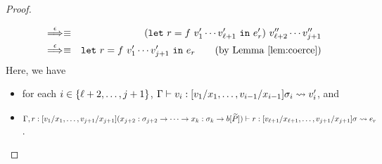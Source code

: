 \begin{proof}
\begin{itemize}
\begin{eqnarray*}
&\stackrel{\epsilon}{\Longrightarrow}_{}\equiv&(\mathtt{let~}r=f\ v_1'\cdots v_{\ell+1}'\mathtt{~in~}e_r')\ v_{\ell+2}''\cdots v_{j+1}'' \\
&\stackrel{\epsilon}{\Longrightarrow}_{}\equiv& \mathtt{let~}r=f\ v_1'\cdots v_{j+1}'\mathtt{~in~}e_r \qquad (\mbox{by Lemma~\ref{lem:coerce}})
\end{eqnarray*}
Here, we have
\begin{itemize}
\item for each \(i \in \{\ell+2,\dots,j+1\}\),
\(\Gamma \vdash v_i : [v_1/x_1,\dots,v_{i-1}/x_{i-1}]\sigma_i \leadsto v_i'\), and
\item
\(\Gamma,r:[v_1/x_1,\dots,v_{j+1}/x_{j+1}](x_{j+2}:\sigma_{j+2} \to \cdots \to x_k:\sigma_k \to b[\widetilde{P}]) \vdash r : [v_{\ell+1}/x_{\ell+1},\dots,v_{j+1}/x_{j+1}]\sigma \leadsto e_r\).
\end{itemize}



\end{itemize}
\end{proof}
